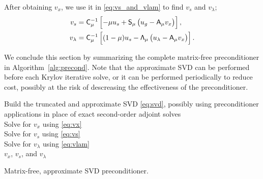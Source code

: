 After obtaining $v_x$, we use it in \eqref{eq:vs_and_vlam} to
find $v_s$ and $v_\lambda$;
\begin{align}
  v_s &= \mathsf{C}_\mu^{-1}\left[-\mu u_s + \mathsf{S}_\mu \left( u_g - \mathsf{A}_\mu v_x\right) \right], \label{eq:vs} \\
  v_\lambda &= \mathsf{C}_\mu^{-1}\left[(1-\mu)u_s - \mathsf{\Lambda}_\mu \left( u_\lambda - \mathsf{A}_\mu v_x \right) \right]. 
  \label{eq:vlam}
\end{align}


We conclude this section by summarizing the complete matrix-free preconditioner
in Algorithm~\ref{alg:precond}.  Note that the approximate SVD can be performed
before each Krylov iterative solve, or it can be performed periodically to
reduce cost, possibly at the risk of descreasing the effectiveness of the
preconditioner.

\LinesNumberedHidden
\begin{algorithm}[tbp]
\SetEndCharOfAlgoLine{}

\BlankLine
Build the truncated and approximate SVD \eqref{eq:svd}, possibly using preconditioner
applications in place of exact second-order adjoint solves \\
Solve for $v_x$ using \eqref{eq:vx}\\
Solve for $v_s$ using \eqref{eq:vs}\\
Solve for $v_\lambda$ using \eqref{eq:vlam}\\
\Return $v_x$, $v_s$, and $v_\lambda$
\caption{Matrix-free, approximate SVD preconditioner. \label{alg:precond}}
\end{algorithm}

